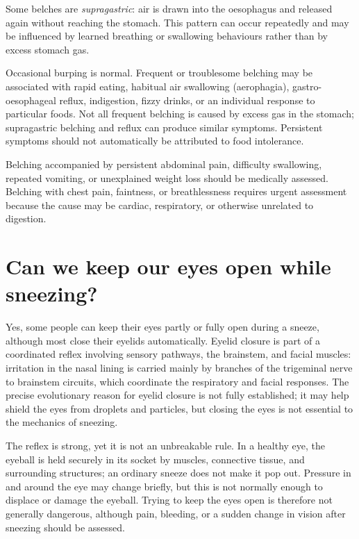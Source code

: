 \documentclass[11pt,oneside]{report}
\begin{document}
Some belches are \emph{supragastric}: air is drawn into the oesophagus and
released again without reaching the stomach. This pattern can occur repeatedly
and may be influenced by learned breathing or swallowing behaviours rather than
by excess stomach gas.

Occasional burping is normal. Frequent or troublesome belching may be
associated with rapid eating, habitual air swallowing (aerophagia),
gastro-oesophageal reflux, indigestion, fizzy drinks, or an individual response
to particular foods. Not all frequent belching is caused by excess gas in the
stomach; supragastric belching and reflux can produce similar symptoms.
Persistent symptoms should not automatically be attributed to food intolerance.

Belching accompanied by persistent abdominal pain, difficulty swallowing,
repeated vomiting, or unexplained weight loss should be medically assessed.
Belching with chest pain, faintness, or breathlessness requires urgent
assessment because the cause may be cardiac, respiratory, or otherwise
unrelated to digestion.

\section{Can we keep our eyes open while sneezing?}

Yes, some people can keep their eyes partly or fully open during a sneeze,
although most close their eyelids automatically. Eyelid closure is part of a
coordinated reflex involving sensory pathways, the brainstem, and facial
muscles: irritation in the nasal lining is carried mainly by branches of the
trigeminal nerve to brainstem circuits, which coordinate the respiratory and
facial responses. The precise evolutionary reason for eyelid closure is not
fully established; it may help shield the eyes from droplets and particles,
but closing the eyes is not essential to the mechanics of sneezing.

The reflex is strong, yet it is not an unbreakable rule. In a healthy eye, the
eyeball is held securely in its socket by muscles, connective tissue, and
surrounding structures; an ordinary sneeze does not make it pop out. Pressure
in and around the eye may change briefly, but this is not normally enough to
displace or damage the eyeball. Trying to keep the eyes open is therefore not
generally dangerous, although pain, bleeding, or a sudden change in vision
after sneezing should be assessed.
\end{document}
